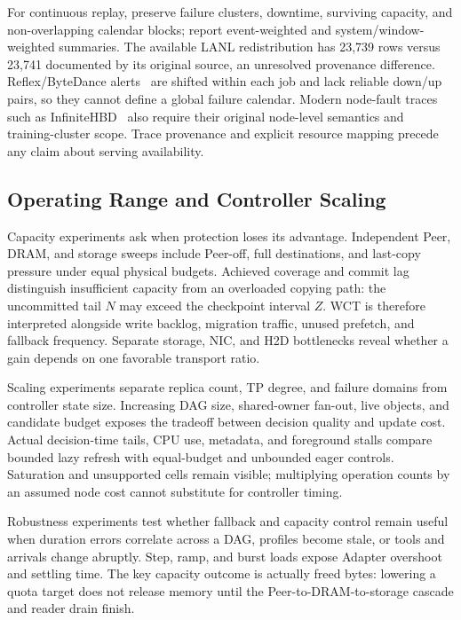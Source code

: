 For continuous replay, preserve failure clusters, downtime, surviving
capacity, and non-overlapping calendar blocks; report event-weighted
and system/window-weighted summaries. The available LANL redistribution
has 23,739 rows versus 23,741 documented by its original source, an
unresolved provenance difference. Reflex/ByteDance
alerts~\cite{ding2026reflex,reflexDataset} are shifted
within each job and lack reliable down/up pairs, so they cannot define
a global failure calendar. Modern node-fault traces such as
InfiniteHBD~\cite{shou2025infinitehbd} also require their original
node-level semantics and training-cluster scope. Trace provenance and
explicit resource mapping precede any claim about serving availability.

\subsection{Operating Range and Controller Scaling}

Capacity experiments ask when protection loses its advantage. Independent
Peer, DRAM, and storage sweeps include Peer-off, full destinations, and
last-copy pressure under equal physical budgets. Achieved coverage and
commit lag distinguish insufficient capacity from an overloaded copying
path: the uncommitted tail $N$ may exceed the checkpoint interval $Z$.
WCT is therefore interpreted alongside write backlog, migration traffic,
unused prefetch, and fallback frequency. Separate storage, NIC, and H2D
bottlenecks reveal whether a gain depends on one favorable transport ratio.

Scaling experiments separate replica count, TP degree, and failure domains
from controller state size. Increasing DAG size, shared-owner fan-out,
live objects, and candidate budget exposes the tradeoff between decision
quality and update cost. Actual decision-time tails, CPU use, metadata,
and foreground stalls compare bounded lazy refresh with equal-budget
and unbounded eager controls. Saturation and unsupported cells remain
visible; multiplying operation counts by an assumed node cost cannot
substitute for controller timing.

Robustness experiments test whether fallback and capacity control remain
useful when duration errors correlate across a DAG, profiles become stale,
or tools and arrivals change abruptly. Step, ramp, and burst loads expose
Adapter overshoot and settling time. The key capacity outcome is actually
freed bytes: lowering a quota target does not release memory until the
Peer-to-DRAM-to-storage cascade and reader drain finish.

